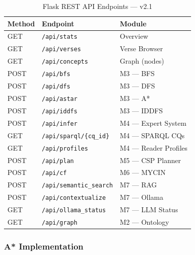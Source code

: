 \documentclass[conference]{IEEEtran}
\begin{document}
\begin{table}[htbp]
\caption{Flask REST API Endpoints — v2.1}
\label{tab:api}
\centering
\begin{tabular}{lp{3.6cm}p{2.4cm}}
\toprule
\textbf{Method} & \textbf{Endpoint} & \textbf{Module} \\
\midrule
GET  & \texttt{/api/stats}               & Overview \\
GET  & \texttt{/api/verses}              & Verse Browser \\
GET  & \texttt{/api/concepts}            & Graph (nodes) \\
POST & \texttt{/api/bfs}          & M3 — BFS \\
POST & \texttt{/api/dfs}          & M3 — DFS \\
POST & \texttt{/api/astar}        & M3 — A* \\
POST & \texttt{/api/iddfs}        & M3 — IDDFS \\
POST & \texttt{/api/infer}               & M4 — Expert System \\
GET  & \texttt{/api/sparql/\{cq\_id\}}    & M4 — SPARQL CQs \\
GET  & \texttt{/api/profiles}            & M4 — Reader Profiles \\
POST & \texttt{/api/plan}                & M5 — CSP Planner \\
POST & \texttt{/api/cf}      & M6 — MYCIN \\
POST & \texttt{/api/semantic\_search}    & M7 — RAG \\
POST & \texttt{/api/contextualize}       & M7 — Ollama \\
GET  & \texttt{/api/ollama\_status}      & M7 — LLM Status \\
GET  & \texttt{/api/graph}         & M2 — Ontology \\
\bottomrule
\end{tabular}
\end{table}

\subsubsection{A* Implementation}
\end{document}
